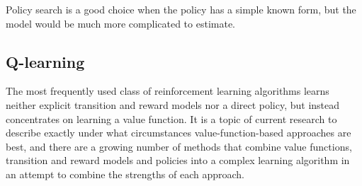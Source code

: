 Policy search is a good choice when the policy has a simple known
form, but the model would be much more complicated to estimate.





\subsection{Q-learning}

\label{sec:q_learning}

The most frequently used class of reinforcement learning algorithms learns neither explicit
transition and reward models nor a direct policy, but instead
concentrates on learning a value function.  It is a topic of current
research to describe exactly under what circumstances
value-function-based approaches are best, and there are a growing
number of methods that combine value functions, transition and reward
models and policies into a complex learning algorithm in an attempt to
combine the strengths of each approach.

